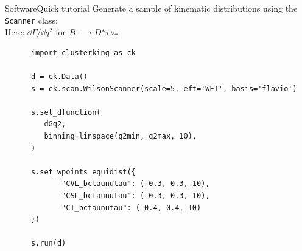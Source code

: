 \begin{frame}[t, fragile]{Software}{Quick tutorial}
    Generate a sample of kinematic distributions using the \texttt{Scanner} class:\\
    {\footnotesize Here: $\dd\Gamma/\dd q^2$ for $B\longrightarrow D^*\tau\bar\nu_\tau$}
    
    \begin{verbatim}
      import clusterking as ck
       
      d = ck.Data()
      s = ck.scan.WilsonScanner(scale=5, eft='WET', basis='flavio')
        
      s.set_dfunction(
         dGq2,
         binning=linspace(q2min, q2max, 10),
      )
      
      s.set_wpoints_equidist({
             "CVL_bctaunutau": (-0.3, 0.3, 10),
             "CSL_bctaunutau": (-0.3, 0.3, 10),
             "CT_bctaunutau": (-0.4, 0.4, 10)
      })
      
      s.run(d)
    \end{verbatim}
\end{frame}

